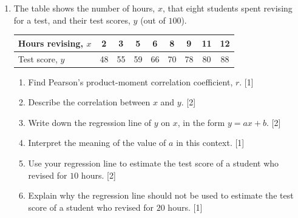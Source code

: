 \documentclass[12pt, twoside]{article}
\begin{document}
\begin{enumerate}[itemsep=0.15cm]
\newpage

\item[4.] [Maximum mark: 9]

The table shows the number of hours, $x$, that eight students spent
revising for a test, and their test scores, $y$ (out of $100$).

\begin{center}
\setlength{\tabcolsep}{7pt}\renewcommand{\arraystretch}{1.2}
\begin{tabular}{|l|c|c|c|c|c|c|c|c|}
\hline
Hours revising, $x$ & 2 & 3 & 5 & 6 & 8 & 9 & 11 & 12 \\
\hline
Test score, $y$ & 48 & 55 & 59 & 66 & 70 & 78 & 80 & 88 \\
\hline
\end{tabular}
\end{center}

\begin{enumerate}[itemsep=0.1cm]
  \item Find Pearson's product-moment correlation coefficient, $r$.
  \hfill [1]
  \item Describe the correlation between $x$ and $y$. \hfill [2]
  \item Write down the regression line of $y$ on $x$, in the form
  $y = ax + b$. \hfill [2]
  \item Interpret the meaning of the value of $a$ in this context.
  \hfill [1]
  \item Use your regression line to estimate the test score of a student
  who revised for $10$ hours. \hfill [2]
  \item Explain why the regression line should not be used to estimate
  the test score of a student who revised for $20$ hours. \hfill [1]
\end{enumerate}


\end{enumerate}
\end{document}
